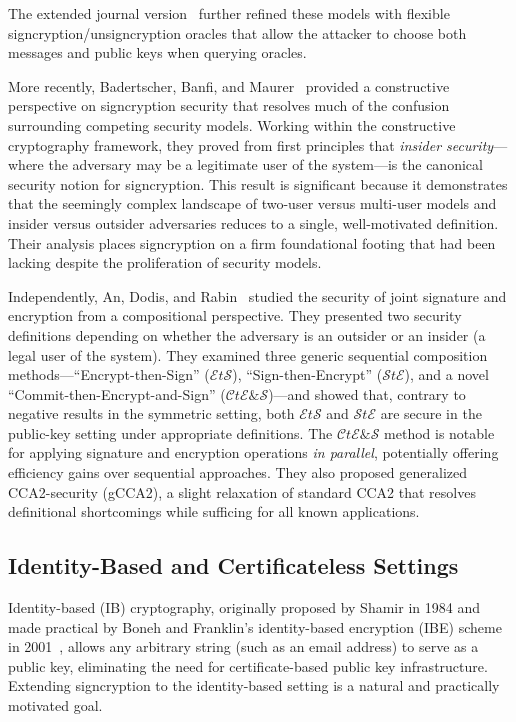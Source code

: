 \documentclass[conference]{IEEEtran}
\begin{document}
The extended journal version~\cite{baek2007} further refined these models with flexible signcryption/unsigncryption oracles that allow the attacker to choose both messages and public keys when querying oracles.

More recently, Badertscher, Banfi, and Maurer~\cite{badertscher2018} provided a constructive perspective on signcryption security that resolves much of the confusion surrounding competing security models. Working within the constructive cryptography framework, they proved from first principles that \textit{insider security}---where the adversary may be a legitimate user of the system---is the canonical security notion for signcryption. This result is significant because it demonstrates that the seemingly complex landscape of two-user versus multi-user models and insider versus outsider adversaries reduces to a single, well-motivated definition. Their analysis places signcryption on a firm foundational footing that had been lacking despite the proliferation of security models.

Independently, An, Dodis, and Rabin~\cite{an2002} studied the security of joint signature and encryption from a compositional perspective. They presented two security definitions depending on whether the adversary is an outsider or an insider (a legal user of the system). They examined three generic sequential composition methods---``Encrypt-then-Sign'' ($\mathcal{E}t\mathcal{S}$), ``Sign-then-Encrypt'' ($\mathcal{S}t\mathcal{E}$), and a novel ``Commit-then-Encrypt-and-Sign'' ($\mathcal{C}t\mathcal{E}\&\mathcal{S}$)---and showed that, contrary to negative results in the symmetric setting, both $\mathcal{E}t\mathcal{S}$ and $\mathcal{S}t\mathcal{E}$ are secure in the public-key setting under appropriate definitions. The $\mathcal{C}t\mathcal{E}\&\mathcal{S}$ method is notable for applying signature and encryption operations \textit{in parallel}, potentially offering efficiency gains over sequential approaches. They also proposed generalized CCA2-security (gCCA2), a slight relaxation of standard CCA2 that resolves definitional shortcomings while sufficing for all known applications.

\subsection{Identity-Based and Certificateless Settings}

Identity-based (IB) cryptography, originally proposed by Shamir in 1984 and made practical by Boneh and Franklin's identity-based encryption (IBE) scheme in 2001~\cite{boneh2001}, allows any arbitrary string (such as an email address) to serve as a public key, eliminating the need for certificate-based public key infrastructure. Extending signcryption to the identity-based setting is a natural and practically motivated goal.
\end{document}
